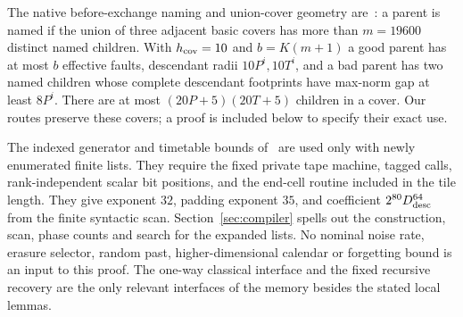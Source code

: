 The native before-exchange naming and union-cover geometry are~\cite[Lemma~13.4]{DMMemory2026}: a parent is named if the union of three adjacent basic covers has more than $m=19600$ distinct named children. With $h_{\rm cov}=10$ and $b=K(m+1)$ a good parent has at most $b$ effective faults, descendant radii $10P^i,10T^i$, and a bad parent has two named children whose complete descendant footprints have max-norm gap at least $8P^i$. There are at most $(20P+5)(20T+5)$ children in a cover. Our routes preserve these covers; a proof is included below to specify their exact use.

The indexed generator and timetable bounds of~\cite[Lemmas~13.5 and~13.7]{DMMemory2026} are used only with newly enumerated finite lists. They require the fixed private tape machine, tagged calls, rank-independent scalar bit positions, and the end-cell routine included in the tile length. They give exponent $32$, padding exponent $35$, and coefficient $2^{80}D_{\rm desc}^{64}$ from the finite syntactic scan. Section~\ref{sec:compiler} spells out the construction, scan, phase counts and search for the expanded lists. No nominal noise rate, erasure selector, random past, higher-dimensional calendar or forgetting bound is an input to this proof. The one-way classical interface and the fixed recursive recovery are the only relevant interfaces of the memory besides the stated local lemmas.
